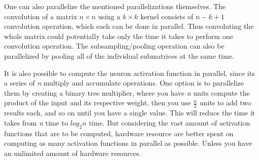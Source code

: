One can also parallelize the mentioned parallelizations themselves. The convolution of a matrix $ n \times n $ using a $ k \times k $ kernel consists of $ n - k + 1 $ convolution operation, which each can be done in parallel. Thus convoluting the whole matrix could potentially take only the time it takes to perform one convolution operation. The subsampling/pooling operation can also be parallelized by pooling all of the individual submatrices at the same time.  
	
It is also possible to compute the neuron activation function in parallel, since its a series of  \textit{n} multiply and accumulate operations. One option is to parallelize them by creating a binary tree multiplier, where you have \textit{n} units compute the product of the input and its respective weight, then you use $ \frac{n}{2} $ units to add two results each, and so on until you have a single value. This will reduce the time it takes from \textit{n} time to $ log_2 n $ time. But considering the vast amount of activation functions that are to be computed, hardware resource are better spent on computing as many activation functions in parallel as possible. Unless you have an unlimited amount of hardware resources.   
















